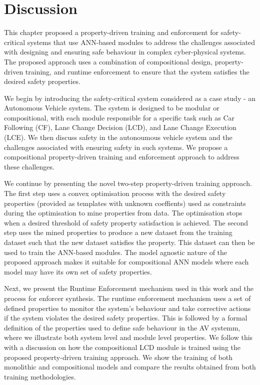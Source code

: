 \section{Discussion}

This chapter proposed a property-driven training and enforcement for safety-critical systems that use ANN-based modules to address the challenges associated with designing and ensuring safe behaviour in complex cyber-physical systems. The proposed approach uses a combination of compositional design, property-driven training, and runtime enforcement to ensure that the system satisfies the desired safety properties.

We begin by introducing the safety-critical system considered as a case study -  an Autonomous Vehicle system. The system is designed to be modular or compositional, with each module responsible for a specific task such as Car Following (CF), Lane Change Decision (LCD), and Lane Change Execution (LCE). We then discuss safety in the autonoumous vehicle system and the challenges associated with ensuring safety in such systems. We propose a compositional property-driven training and enforcement approach to address these challenges.

We continue by presenting the novel two-step property-driven training approach. The first step uses a convex optimisation process with the desired safety properties (provided as templates with unknown coeffients) used as constraints during the optimisation to mine properties from data. The optimisation stops when a desired threshold of safety property satisfaction is achieved. The second step uses the mined properties to produce a new dataset from the training dataset such that the new dataset satisfies the property. This dataset can then be used to train the ANN-based modules. The model agnostic nature of the proposed approach makes it suitable for compositional ANN models where each model may have its own set of safety properties. 

Next, we present the Runtime Enforcement mechanism used in this work and the process for enforcer synthesis. The runtime enforcement mechanism uses a set of defined properties to monitor the system's behaviour and take corrective actions if the system violates the desired safety properties. This is followed by a formal definition of the properties used to define safe behaviour in the AV systemm, where we illustrate both system level and module level properties. We follow this with a discussion on how the compositional LCD module is trained using the proposed property-driven training approach. We show the training of both monolithic and compositional models and compare the results obtained from both training methodologies.

